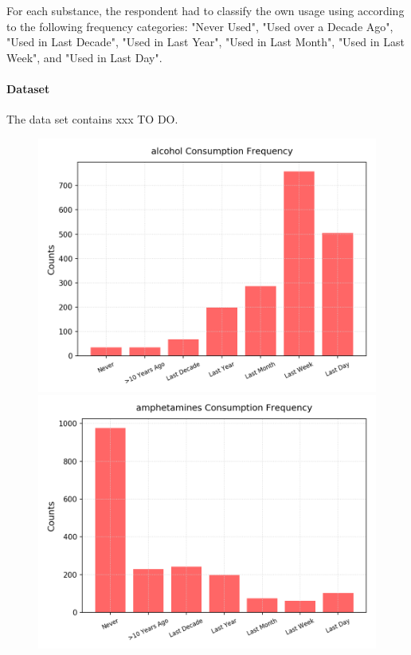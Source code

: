 \documentclass{article}
\begin{document}
For each substance, the respondent had to classify the own usage using according to the following frequency categories: "Never Used", "Used over a Decade Ago", "Used in Last Decade", "Used in Last Year", "Used in Last Month", "Used in Last Week", and "Used in Last Day".



\clearpage
\paragraph{Dataset}

\noindent The data set contains xxx TO DO.

\begin{figure}[h!]
	\centering
	\begin{minipage}[b]{0.32\textwidth}
		\includegraphics[width=\textwidth]{plots/drugsPlots/alcohol_freq.png}

	\end{minipage}
	\begin{minipage}[b]{0.32\textwidth}
		\includegraphics[width=\textwidth]{plots/drugsPlots/amphetamines_freq.png}


\end{minipage}
\end{figure}
\end{document}

